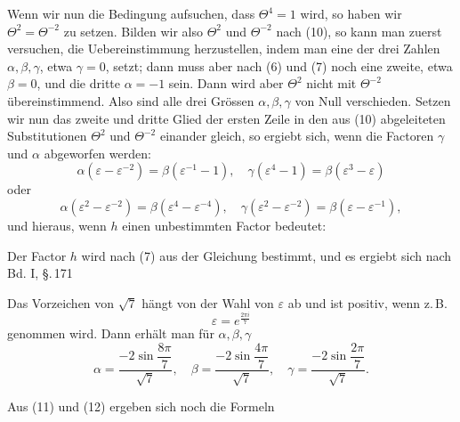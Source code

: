Wenn wir nun die Bedingung aufsuchen, dass $\Theta^4 = 1$ wird,
so haben wir $\Theta^2 = \Theta^{-2}$ zu setzen. Bilden wir also $\Theta^2$ und $\Theta^{-2}$
nach (10), so kann man zuerst versuchen, die Uebereinstimmung
herzustellen, indem man eine der drei Zahlen $\alpha, \beta, \gamma$, etwa $\gamma = 0$,
setzt; dann muss aber nach (6) und (7) noch eine zweite, etwa
$\beta = 0$, und die dritte $\alpha = -1$ sein. Dann wird aber $\Theta^2$ nicht
mit $\Theta^{-2}$ übereinstimmend. Also sind alle drei Grössen $\alpha, \beta, \gamma$
von Null verschieden. Setzen wir nun das zweite und dritte
Glied der ersten Zeile in den aus (10) abgeleiteten Substitutionen
$\Theta^2$ und $\Theta^{-2}$ einander gleich, so ergiebt sich, wenn die Factoren
$\gamma$ und $\alpha$ abgeworfen werden:
\[
\alpha(\varepsilon - \varepsilon^{-2}) = \beta(\varepsilon^{-1} - 1), \quad \gamma(\varepsilon^4 - 1) = \beta(\varepsilon^3 - \varepsilon)
\]
oder
\[
\alpha(\varepsilon^2 - \varepsilon^{-2}) = \beta(\varepsilon^4 - \varepsilon^{-4}), \quad \gamma(\varepsilon^2 - \varepsilon^{-2}) = \beta(\varepsilon - \varepsilon^{-1}),
\]
und hieraus, wenn $h$ einen unbestimmten Factor bedeutet:

Der Factor $h$ wird nach (7) aus der Gleichung
bestimmt, und es ergiebt sich nach Bd. I, \S.\,171

Das Vorzeichen von $\sqrt{7}$ hängt von der Wahl von $\varepsilon$ ab und
ist positiv, wenn z.\,B.
\[
\varepsilon = e^{\frac{2\pi i}{7}}
\]
genommen wird. Dann erhält man für $\alpha, \beta, \gamma$
\[
\alpha = \frac{-2\sin\dfrac{8\pi}{7}}{\sqrt{7}}, \quad \beta = \frac{-2\sin\dfrac{4\pi}{7}}{\sqrt{7}}, \quad \gamma = \frac{-2\sin\dfrac{2\pi}{7}}{\sqrt{7}}.
\]

Aus (11) und (12) ergeben sich noch die Formeln
